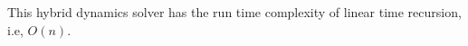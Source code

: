 This hybrid dynamics solver has the run time complexity of linear time recursion, i.e, $O(n)$. 
\newpage

